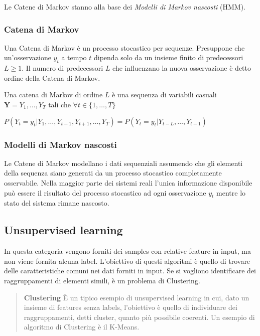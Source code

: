 \documentclass[../main.tex]{subfiles}
\begin{document}
Le Catene di Markov stanno alla base dei \textit{Modelli di Markov nascosti} (HMM).

\subsubsection{Catena di Markov}
Una Catena di Markov è un processo stocastico per sequenze. Presuppone che un'osservazione ${y} _ {t}$ a tempo $t$ dipenda solo da un insieme finito di predecessori $L \geq 1$. Il numero di predecessori $L$ che influenzano la nuova osservazione è detto ordine della Catena di Markov.

Una catena di Markov di ordine $L$ è una sequenza di variabili casuali $\mathbf { Y } = Y _ { 1 } , \ldots , Y _ { T }$ tali che $\forall t \in \{ 1 , \ldots , T \}$

\begin{center}
				\begin{math}
								P \left( Y _ { t } = y _ { t } | Y _ { 1 } , \ldots , Y _ { t - 1 } , Y _ { t + 1 } , \ldots , Y _ { T } \right) = P \left( Y _ { t } = y _ { t } | Y _ { t - L } , \ldots , Y _ { t - 1 } \right)
				\end{math}
\end{center}

\subsubsection{Modelli di Markov nascosti}
Le Catene di Markov modellano i dati sequenziali assumendo che gli elementi della sequenza siano generati da un processo stocastico completamente osservabile. Nella maggior parte dei sistemi reali l'unica informazione disponibile può essere il risultato del processo stocastico ad ogni osservazione ${y} _ {t}$ mentre lo stato del sistema rimane nascosto. 

\subsection{Unsupervised learning}
In questa categoria vengono forniti dei samples con relative feature in input, ma non viene fornita alcuna label. L'obiettivo di questi algoritmi è quello di trovare delle caratteristiche comuni nei dati forniti in input. Se si vogliono identificare dei raggruppamenti di elementi simili, è un problema di Clustering.


\begin{verse}
				\textbf{Clustering} È un tipico esempio di unsupervised learning in cui, dato un insieme di features senza labels, l'obiettivo è quello di individuare dei raggruppamenti, detti cluster, quanto più possibile coerenti. Un esempio di algoritmo di Clustering è il K-Means.
\end{verse}	
\end{document}
